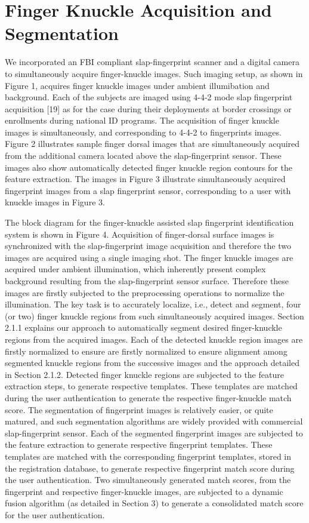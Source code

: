 \section{Finger Knuckle Acquisition and Segmentation}

We incorporated an FBI compliant slap-fingerprint scanner and a digital camera to simultaneously acquire finger-knuckle images. Such imaging setup, as shown in Figure 1, acquires finger knuckle images under ambient illumibation and background. Each of the subjects are imaged using 4-4-2 mode slap fingerprint acquisition [19] as for the case during their deployments at border crossings or enrollments during national ID programs. The acquisition of finger knuckle images is simultaneously, and corresponding to 4-4-2 to fingerprints images. Figure 2 illustrates sample finger dorsal images that are simultaneously acquired from the additional camera located above the slap-fingerprint sensor. These images also show automatically detected finger knuckle region contours for the feature extraction. The images in Figure 3 illustrate simultaneously acquired fingerprint images from a slap fingerprint sensor, corresponding to a user with knuckle images in Figure 3.

The block diagram for the finger-knuckle assisted slap fingerprint identification system is shown in Figure 4. Acquisition of finger-dorsal surface images is synchronized with the slap-fingerprint image acquisition and therefore the two images are acquired using a single imaging shot. The finger knuckle images are acquired under ambient illumination, which inherently present complex background resulting from the slap-fingerprint sensor surface. Therefore these images are firstly subjected to the preprocessing operations to normalize the illumination. The key task is to accurately localize, i.e., detect and segment, four (or two) finger knuckle regions from such simultaneously acquired images. Section 2.1.1 explains our approach to automatically segment desired finger-knuckle regions from the acquired images. Each   of   the   detected   knuckle   region   images  are  firstly normalized to ensure are  firstly normalized to ensure alignment among segmented knuckle regions from the successive images and the approach detailed in Section 2.1.2. Detected finger knuckle regions are subjected to the feature extraction steps, to generate respective templates. These templates are matched during the user authentication to generate the respective finger-knuckle match score. The segmentation of fingerprint images is relatively easier, or quite matured, and such segmentation algorithms are widely provided with commercial slap-fingerprint sensor. Each of the segmented fingerprint images are subjected to the feature extraction to generate respective fingerprint templates. These templates are matched with the corresponding fingerprint templates, stored in the registration database, to generate respective fingerprint match score during the user authentication. Two simultaneously generated match scores, from the fingerprint and respective finger-knuckle images, are subjected to a dynamic fusion algorithm (as detailed in Section 3) to generate a consolidated match score for the user authentication.  

